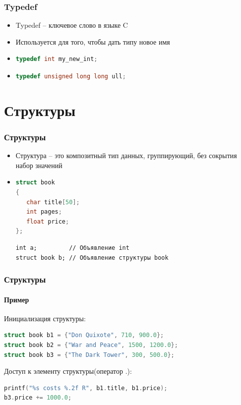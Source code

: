 \documentclass[12pt,pdf,hyperref={unicode}]{beamer}
\begin{document}
\begin{frame}[fragile]
\frametitle{Typedef} 
\begin{itemize}
\item Typedef -- ключевое слово в языке C \\
\item Используется для того, чтобы дать типу новое имя \\
\item 
\begin{lstlisting}[language=C++,basicstyle=\ttfamily,keywordstyle=\color{blue}]
typedef int my_new_int;
\end{lstlisting}
\item 
\begin{lstlisting}[language=C++,basicstyle=\ttfamily,keywordstyle=\color{blue}]
typedef unsigned long long ull;
\end{lstlisting}
\end{itemize}
\end{frame}




\section{Структуры}
\begin{frame}[fragile]
\frametitle{Структуры} 
\begin{itemize}
\item Структура -- это композитный тип данных, группирующий, без сокрытия набор значений \\
\item 
\begin{lstlisting}[language=C++,basicstyle=\ttfamily,keywordstyle=\color{blue}]
struct book 
{
   char title[50];
   int pages;
   float price;
};
\end{lstlisting}
\begin{verbatim}
int a;         // Объявление int 
struct book b; // Объявление структуры book 
\end{verbatim}
\end{itemize}
\end{frame}


\begin{frame}[fragile]
\frametitle{Структуры} 
\framesubtitle{Пример} 
Инициализация структуры:
\begin{lstlisting}[language=C++,basicstyle=\ttfamily,keywordstyle=\color{blue}]
struct book b1 = {"Don Quixote", 710, 900.0};
struct book b2 = {"War and Peace", 1500, 1200.0};
struct book b3 = {"The Dark Tower", 300, 500.0};
\end{lstlisting}
Доступ к элементу структуры(оператор .):
\begin{lstlisting}[language=C++,basicstyle=\ttfamily,keywordstyle=\color{blue}]
printf("%s costs %.2f R", b1.title, b1.price);
b3.price += 1000.0;
\end{lstlisting}
\end{frame}
\end{document}

